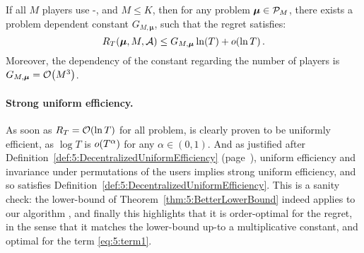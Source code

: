 \begin{theorem}\label{thm:5:LogarithmicRegret_MCTopMklUCB}
\begin{leftbar}[theorembar]  %
  If all $M$ players use
  \MCTopM-\klUCB, and $M \leq K$,
  then for any problem $\boldsymbol{\mu} \in \mathcal{P}_M$,
  there exists a problem dependent constant $G_{M,\boldsymbol{\mu}}$, such that
  the regret satisfies:
  \begin{equation}\label{eq:5:LogarithmicRegret_MCTopMklUCB}
    R_T(\boldsymbol{\mu}, M, \mathcal{A}) \leq G_{M,\boldsymbol{\mu}} \ln(T) + \mathop{}\mathopen{}o\mathopen{}\left(\ln T\right).
  \end{equation}
  Moreover, the dependency of the constant regarding the number of players is $G_{M,\boldsymbol{\mu}} = \mathop{}\mathopen{}\mathcal{O}\mathopen{}\left(M^3\right)$.
\end{leftbar}  %
\end{theorem}




\paragraph{Strong uniform efficiency.}\label{app:5:JustifyingDefinition5}
%
As soon as $R_T = \mathop{}\mathopen{}\mathcal{O}\mathopen{}\left(\ln T\right)$ for all problem, \MCTopM{} is clearly proven
to be uniformly efficient, as $\log T$ is $\mathop{}\mathopen{}o\mathopen{}\left(T^{\alpha}\right)$ for any $\alpha\in(0,1)$.
%
And as justified after Definition~\ref{def:5:DecentralizedUniformEfficiency} (page~\pageref{def:5:DecentralizedUniformEfficiency}), uniform efficiency and invariance under permutations of the users implies strong uniform efficiency, and so \MCTopM{} satisfies Definition~\ref{def:5:DecentralizedUniformEfficiency}.
%
This is a sanity check: the lower-bound of
Theorem~\ref{thm:5:BetterLowerBound} indeed applies to our algorithm \MCTopM,
and finally this highlights that it is order-optimal for the regret, in the sense that it matches the lower-bound up-to a multiplicative constant,
and optimal for the term \ref{eq:5:term1}.



